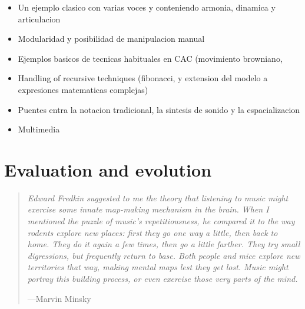 \documentclass{article}
\begin{document}
{\color{red}


\begin{itemize}



\item Un ejemplo clasico con varias voces y conteniendo armonia, dinamica y articulacion
\item Modularidad y posibilidad de manipulacion manual
\item Ejemplos basicos de tecnicas habituales en CAC (movimiento browniano,
\item Handling of recursive techniques (fibonacci, y extension del modelo a expresiones matematicas complejas)
\item Puentes entra la notacion tradicional, la sintesis de sonido y la espacializacion
\item Multimedia
\end{itemize}

}



\section{Evaluation and evolution}

\begin{samepage}
\begin{quotation}
\textsl{Edward Fredkin suggested to me the theory that listening to music might exercise some innate map-making mechanism in the brain. When I mentioned the puzzle of music's repetitiousness, he compared it to the way rodents explore new places: first they go one way a little, then back to home. They do it again a few times, then go a little farther. They try small digressions, but frequently return to base. Both people and mice explore new territories that way, making mental maps lest they get lost. Music might portray this building process, or even exercise those very parts of the mind.}

---Marvin Minsky \cite{Minsky1981}\end{quotation}
\end{samepage}
\end{document}
